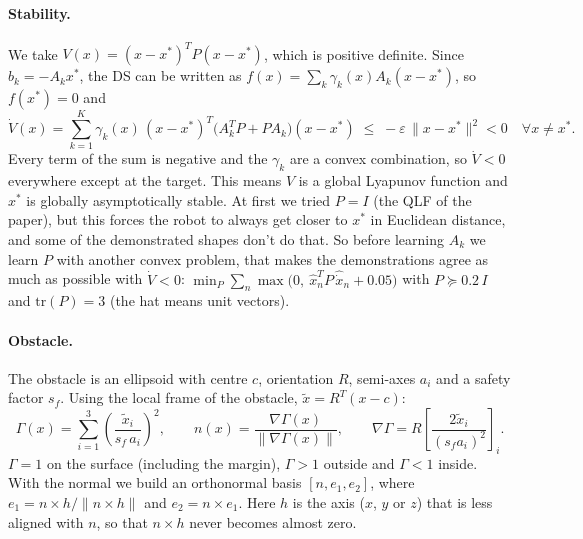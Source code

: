﻿\documentclass[10pt,a4paper]{article}
\begin{document}
\paragraph{Stability.} We take $V(x)=(x-x^*)^{T}P(x-x^*)$, which is positive definite. Since
$b_k=-A_kx^*$, the DS can be written as $f(x)=\sum_k\gamma_k(x)A_k(x-x^*)$, so $f(x^*)=0$ and
\begin{equation}
\dot V(x)=\sum_{k=1}^{K}\gamma_k(x)\,(x-x^*)^{T}\big(A_k^{T}P+PA_k\big)(x-x^*)
\;\le\; -\varepsilon\,\|x-x^*\|^2<0\quad \forall x\neq x^* .
\end{equation}
Every term of the sum is negative and the $\gamma_k$ are a convex combination, so $\dot V<0$
everywhere except at the target. This means $V$ is a global Lyapunov function and $x^*$ is globally
asymptotically stable. At first we tried $P=I$ (the QLF of the paper), but this forces the robot to
always get closer to $x^*$ in Euclidean distance, and some of the demonstrated shapes don't do that.
So before learning $A_k$ we learn $P$ with another convex problem, that makes the demonstrations agree
as much as possible with $\dot V<0$:
$\min_P \sum_n \max\!\big(0,\ \hat{x}_n^{T}P\,\hat{\dot x}_n+0.05\big)$ with
$P\succeq 0.2\,I$ and $\mathrm{tr}(P)=3$ (the hat means unit vectors).

\paragraph{Obstacle.} The obstacle is an ellipsoid with centre $c$, orientation $R$, semi-axes $a_i$
and a safety factor $s_f$. Using the local frame of the obstacle, $\tilde x = R^{T}(x-c)$:
\begin{equation}
\Gamma(x)=\sum_{i=1}^{3}\left(\frac{\tilde x_i}{s_f\,a_i}\right)^{2},\qquad
n(x)=\frac{\nabla\Gamma(x)}{\|\nabla\Gamma(x)\|},\qquad
\nabla\Gamma = R\left[\frac{2\tilde x_i}{(s_f a_i)^2}\right]_{i}.
\end{equation}
$\Gamma=1$ on the surface (including the margin), $\Gamma>1$ outside and $\Gamma<1$ inside. With the
normal we build an orthonormal basis $[n,e_1,e_2]$, where $e_1 = n\times h/\|n\times h\|$ and
$e_2=n\times e_1$. Here $h$ is the axis ($x$, $y$ or $z$) that is less aligned with $n$, so that
$n\times h$ never becomes almost zero.
\end{document}
